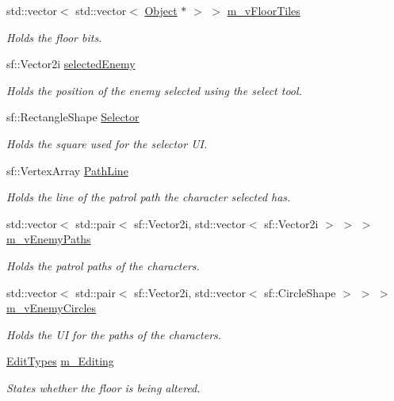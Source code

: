\begin{DoxyCompactItemize}
std\+::vector$<$ std\+::vector$<$ \hyperlink{class_object}{Object} $\ast$ $>$ $>$ \hyperlink{class_editor_aceefb538ec2410d4cd776bd032267c07}{m\+\_\+v\+Floor\+Tiles}
\begin{DoxyCompactList}\small\item\em Holds the floor bits. \end{DoxyCompactList}\item 
sf\+::\+Vector2i \hyperlink{class_editor_a10d877f02b735b8c21ba712bb9a9c24c}{selected\+Enemy}
\begin{DoxyCompactList}\small\item\em Holds the position of the enemy selected using the select tool. \end{DoxyCompactList}\item 
sf\+::\+Rectangle\+Shape \hyperlink{class_editor_a1b59487821fc37d571b402bc4c0586b8}{Selector}
\begin{DoxyCompactList}\small\item\em Holds the square used for the selector UI. \end{DoxyCompactList}\item 
sf\+::\+Vertex\+Array \hyperlink{class_editor_a2ee9ceea2880d36702d24ed51e774b3c}{Path\+Line}
\begin{DoxyCompactList}\small\item\em Holds the line of the patrol path the character selected has. \end{DoxyCompactList}\item 
std\+::vector$<$ std\+::pair$<$ sf\+::\+Vector2i, std\+::vector$<$ sf\+::\+Vector2i $>$ $>$ $>$ \hyperlink{class_editor_a8f0798b89dd3ec768408e5b5eddc4ec5}{m\+\_\+v\+Enemy\+Paths}
\begin{DoxyCompactList}\small\item\em Holds the patrol paths of the characters. \end{DoxyCompactList}\item 
std\+::vector$<$ std\+::pair$<$ sf\+::\+Vector2i, std\+::vector$<$ sf\+::\+Circle\+Shape $>$ $>$ $>$ \hyperlink{class_editor_a27b37d416a567bdd076af498e78031dd}{m\+\_\+v\+Enemy\+Circles}
\begin{DoxyCompactList}\small\item\em Holds the UI for the paths of the characters. \end{DoxyCompactList}\item 
\hyperlink{_editor_8h_a831c188be166b2948b4154ff08be16ca}{Edit\+Types} \hyperlink{class_editor_a4c91f56b9a8b7ea9c37408e226002cb6}{m\+\_\+\+Editing}
\begin{DoxyCompactList}\small\item\em States whether the floor is being altered. \end{DoxyCompactList}\item 

\end{DoxyCompactItemize}

